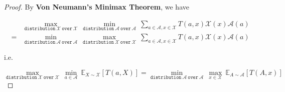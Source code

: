 \documentclass{article}
\newcommand{\staExp}[2]{\mathbb{E}_{#1}\left[#2\right]}
\begin{document}
\begin{proof}
    
    \hspace{1.3em}
    By \textbf{Von Neumann's Minimax Theorem}, we have
    
    \vspace{-2.5em}
    \begin{align*}
        &\underset{\mathtt{distribution\ }\mathscr{X}\mathtt{\ over\ }\mathcal{X}}{\max}\ \underset{\mathtt{distribution\ }\mathscr{A}\mathtt{\ over\ }\mathcal{A}}{\min}\ \sum_{a\in\mathcal{A},x\in\mathcal{X}}T(a,x)\mathscr{X}(x)\mathscr{A}(a) \\
        =&\underset{\mathtt{distribution\ }\mathscr{A}\mathtt{\ over\ }\mathcal{A}}{\min}\ \underset{\mathtt{distribution\ }\mathscr{X}\mathtt{\ over\ }\mathcal{X}}{\max}\ \sum_{a\in\mathcal{A},x\in\mathcal{X}}T(a,x)\mathscr{X}(x)\mathscr{A}(a)
    \end{align*}
    
    \vspace{-0.75em} \hspace{1.3em}
    i.e.
    
    \vspace{-1em}
    $$\underset{\mathtt{distribution\ }\mathscr{X}\mathtt{\ over\ }\mathcal{X}}{\max}\ \underset{a\in \mathcal{A}}{\min}\ \staExp{X\sim\mathscr{X}}{T(a,X)} =  \underset{\mathtt{distribution\ }\mathscr{A}\mathtt{\ over\ }\mathcal{A}}{\min}\ \underset{x\in \mathcal{X}}{\max}\ \staExp{A\sim\mathscr{A}}{T(A,x)}$$
    
    \vspace{-2.55em}
\end{proof}
\end{document}
